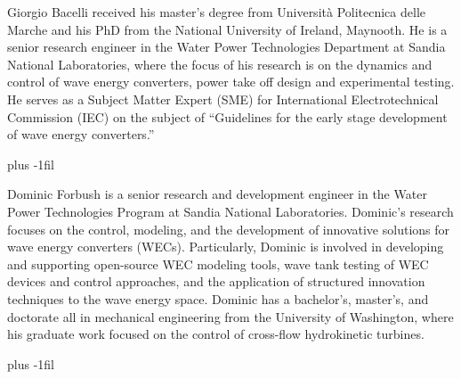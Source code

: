 \documentclass[lettersize,journal]{IEEEtran}
\begin{document}
\begin{IEEEbiography}{Giorgio Bacelli} received his master's degree from Università Politecnica delle Marche and his PhD from the National University of Ireland, Maynooth. 
He is a senior research engineer in the Water Power Technologies Department at Sandia National Laboratories, where the focus of his research is on the dynamics and control of wave energy converters, power take off design and experimental testing.
He serves as a Subject Matter Expert (SME) for International Electrotechnical Commission (IEC) on the subject of ``Guidelines for the early stage development of wave energy converters.''
\end{IEEEbiography}

\vskip 0pt plus -1fil

\begin{IEEEbiography}{Dominic Forbush}
is a senior research and development engineer in the Water Power Technologies Program at Sandia National Laboratories.
Dominic's research focuses on the control, modeling, and the development of innovative solutions for wave energy converters (WECs).
Particularly, Dominic is involved in developing and supporting open-source WEC modeling tools, wave tank testing of WEC devices and control approaches, and the application of structured innovation techniques to the wave energy space.
Dominic has a bachelor's, master's, and doctorate all in mechanical engineering from the University of Washington, where his graduate work focused on the control of cross-flow hydrokinetic turbines.
\end{IEEEbiography}

\vskip 0pt plus -1fil
\end{document}
